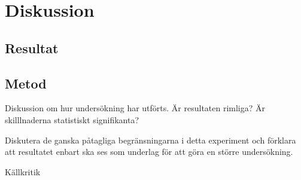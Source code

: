 \section{Diskussion}
\label{sec:joel_a-discussion}

\subsection{Resultat}
\label{subsec:joel_a-discussion-results}

\subsection{Metod}
\label{subsec:joel_a-discussion-method}
Diskussion om hur undersökning har utförts. Är resultaten rimliga? Är skilllnaderna statistiskt signifikanta?

Diskutera de ganska påtagliga begränsningarna i detta experiment och förklara att resultatet enbart ska ses som underlag för att göra en större undersökning.

Källkritik